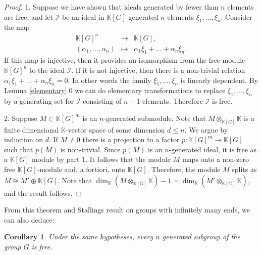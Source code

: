 \documentclass[11pt,letterpaper]{amsart}
\newtheorem{corollary}[theorem]{Corollary}
\begin{document}
\begin{proof}
1. Suppose we have shown that ideals generated by fewer than $n$ elements are free, and let $\mathcal{I}$ be an ideal in $\mathbb{K} [G]$ generated $n$ elements $\xi_1,\dots,\xi_n$. Consider the map
\begin{eqnarray*}
\mathbb K[G]^n&{\rightarrow}&\mathbb{K}[G],\\
(\alpha_1, \ldots, \alpha_n) & \mapsto & \alpha_1 \xi_1+\ldots +\alpha_n\xi_n.
\end{eqnarray*}
If this map is injective, then it provides an isomorphism from the free module $\mathbb K[G]^n$ to the ideal $\mathcal I$. If it is not injective, then there is a non-trivial relation $\alpha_1\xi_1 + \ldots + \alpha_n \xi_n = 0$. In other words the family $\xi_1,\dots,\xi_n$ is linearly dependent. By Lemma \ref{elementary}.0 we can do elementary transformations to replace $\xi_1,\dots,\xi_n$ by a generating set for $\mathcal I$ consisting of $n-1$ elements. Therefore $\mathcal I$ is free. 

2. Suppose $M \subset \mathbb{K} [G]^m$ is an $n$-generated submodule. Note that $M \otimes_{\mathbb{K} [G]} \mathbb{K}$ is a finite dimensional $\mathbb{K}$-vector space of some dimension $d\leq n$. We argue by induction on $d$. If $M \neq 0$ there is a projection to a factor $p : \mathbb{K} [G]^m\rightarrow \mathbb{K} [G]$ such that $p (M)$ is non-trivial. Since $p (M)$ is an $n$-generated ideal, it is free as a $\mathbb{K} [G]$ module by part 1. It follows that the module $M$ maps onto a non-zero free $\mathbb{K} [G]$-module and, a fortiori, onto $\mathbb{K} [G]$. Therefore, the module $M$ splits as $M \cong M' \oplus \mathbb{K} [G]$. Note that $\dim_{\mathbb{K}} (M\otimes_{\mathbb{K} [G]} \mathbb{K}) - 1 = \dim_{\mathbb{K}} (M' \otimes_{\mathbb{K} [G]} \mathbb{K})$, and the result follows.
\end{proof}

From this theorem and Stallings result on groups with infinitely many ends, we can also deduce:

\begin{corollary}
\label{stallings}
Under the same hypotheses, every $n$ generated subgroup of the group $G$ is free.
\end{corollary}
\end{document}

